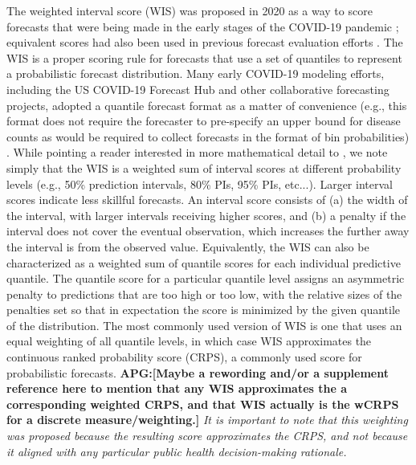 \documentclass{article}\usepackage[]{graphicx}\usepackage[]{xcolor}
\def\apg#1{{\color{red}\textbf{APG:[#1]}}}
\begin{document}
The weighted interval score (WIS) was proposed in 2020 as a way to score forecasts that were being made in the early stages of the COVID-19 pandemic \citep{bracher2021evaluating}; equivalent scores had also been used in previous forecast evaluation efforts \cite[e.g.,][]{hong2016probabilisticEnergyForecasting}.
The WIS is a proper scoring rule for forecasts that use a set of quantiles to represent a probabilistic forecast distribution.
Many early COVID-19 modeling efforts, including the US COVID-19 Forecast Hub and other collaborative forecasting projects, adopted a quantile forecast format as a matter of convenience (e.g., this format does not require the forecaster to pre-specify an upper bound for disease counts as would be required to collect forecasts in the format of bin probabilities) \citep{cramer_united_2022}.
While pointing a reader interested in more mathematical detail to \cite{bracher2021evaluating}, we note simply that the WIS is a weighted sum of interval scores at different probability levels (e.g., 50\% prediction intervals, 80\% PIs, 95\% PIs, etc...).
Larger interval scores indicate less skillful forecasts.
An interval score consists of (a) the width of the interval, with larger intervals receiving higher scores, and (b) a penalty if the interval does not cover the eventual observation, which increases the further away the interval is from the observed value.
Equivalently, the WIS can also be characterized as a weighted sum of quantile scores for each individual predictive quantile.
The quantile score for a particular quantile level assigns an asymmetric penalty to predictions that are too high or too low, with the relative sizes of the penalties set so that in expectation the score is minimized by the given quantile of the distribution.
The most commonly used version of WIS is one that uses an equal weighting of all quantile levels, in which case WIS approximates the continuous ranked probability score (CRPS), a commonly used score for probabilistic forecasts.
\apg{Maybe a rewording and/or a supplement reference here to mention that any WIS approximates the a corresponding weighted CRPS, and that WIS actually is the wCRPS for a discrete measure/weighting.}
\emph{It is important to note that this weighting was proposed because the resulting score approximates the CRPS, and not because it aligned with any particular public health decision-making rationale.}
\end{document}
